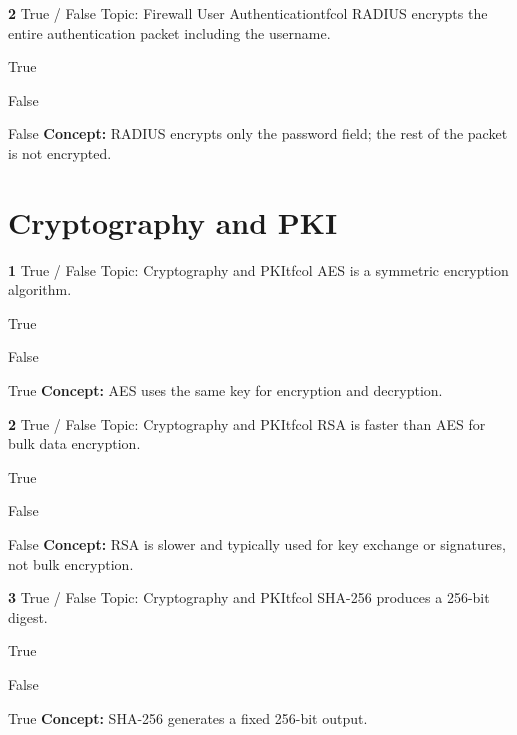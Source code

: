 \documentclass[10pt,a4paper]{article}
\begin{document}
\begin{qcard}{\color{white}\textbf{2} \hfill \small True / False \textbar{} Topic: Firewall User Authentication}{tfcol}
RADIUS encrypts the entire authentication packet including the username.

\begin{qoptions}
\item True
\item False
\end{qoptions}
\begin{explainbox}{False}
\textbf{Concept:} RADIUS encrypts only the password field; the rest of the packet is not encrypted.
\end{explainbox}
\end{qcard}

\section{Cryptography and PKI}
\begin{qcard}{\color{white}\textbf{1} \hfill \small True / False \textbar{} Topic: Cryptography and PKI}{tfcol}
AES is a symmetric encryption algorithm.

\begin{qoptions}
\item True
\item False
\end{qoptions}
\begin{explainbox}{True}
\textbf{Concept:} AES uses the same key for encryption and decryption.
\end{explainbox}
\end{qcard}

\begin{qcard}{\color{white}\textbf{2} \hfill \small True / False \textbar{} Topic: Cryptography and PKI}{tfcol}
RSA is faster than AES for bulk data encryption.

\begin{qoptions}
\item True
\item False
\end{qoptions}
\begin{explainbox}{False}
\textbf{Concept:} RSA is slower and typically used for key exchange or signatures, not bulk encryption.
\end{explainbox}
\end{qcard}

\begin{qcard}{\color{white}\textbf{3} \hfill \small True / False \textbar{} Topic: Cryptography and PKI}{tfcol}
SHA-256 produces a 256-bit digest.

\begin{qoptions}
\item True
\item False
\end{qoptions}
\begin{explainbox}{True}
\textbf{Concept:} SHA-256 generates a fixed 256-bit output.
\end{explainbox}
\end{qcard}
\end{document}
